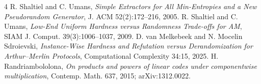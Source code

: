 \documentclass[11pt]{article}
\begin{document}
\begin{thebibliography}{4}
 R. Shaltiel and C. Umans, \emph{Simple Extractors for All Min-Entropies and a New Pseudorandom Generator}, J. ACM 52(2):172--216, 2005.
 R. Shaltiel and C. Umans, \emph{Low-End Uniform Hardness versus Randomness Trade-offs for AM}, SIAM J. Comput. 39(3):1006--1037, 2009.
 D. van Melkebeek and N. Mocelin Sdroievski, \emph{Instance-Wise Hardness and Refutation versus Derandomization for Arthur--Merlin Protocols}, Computational Complexity 34:15, 2025.
 H. Randriambololona, \emph{On products and powers of linear codes under componentwise multiplication}, Contemp. Math. 637, 2015; arXiv:1312.0022.
\end{thebibliography}
\end{document}
